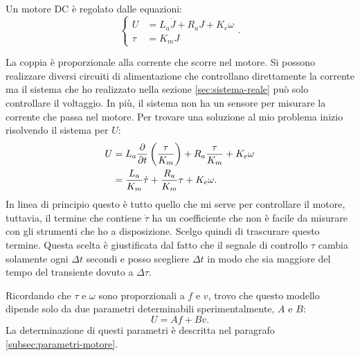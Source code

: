 Un motore DC è regolato dalle equazioni: 
\begin{equation*}
    \left\{
    \begin{aligned}
        U &= L_a \dot J + R_a J + K_e \omega \\
        \tau &= K_m J
    \end{aligned}
    \right.
    .
\end{equation*}

La coppia è proporzionale alla corrente che scorre nel motore. Si possono realizzare diversi circuiti di alimentazione che controllano direttamente la corrente ma il sistema che ho realizzato nella sezione \ref{sec:sistema-reale} può solo controllare il voltaggio. In più, il sistema non ha un sensore per misurare la corrente che passa nel motore.
Per trovare una soluzione al mio problema inizio risolvendo il sistema per $U$:
\begin{equation*}
    \begin{aligned}
        U &= L_a \frac \partial {\partial t} \left(\frac \tau {K_m}\right) + R_a \frac \tau {K_m} + K_e \omega \\
        &= \frac {L_a} {K_m} \dot\tau + \frac{R_a}{K_m}  \tau + K_e \omega.
    \end{aligned}
\end{equation*}
In linea di principio questo è tutto quello che mi serve per controllare il motore, tuttavia, il termine che contiene $\dot \tau$ ha un coefficiente che non è facile da misurare con gli strumenti che ho a disposizione. Scelgo quindi di trascurare questo termine. Questa scelta è giustificata dal fatto che il segnale di controllo $\tau$ cambia solamente ogni $\Delta t$ secondi e posso scegliere $\Delta t$ in modo che sia maggiore del tempo del transiente dovuto a $\Delta \tau$.

Ricordando che $\tau$ e $\omega$ sono proporzionali a $f$ e $v$, trovo che questo modello dipende solo da due parametri determinabili sperimentalmente, $A$ e $B$:
\begin{equation}
    U = A f + B v.
    \label{eq:caratteristica-motore}
\end{equation}
La determinazione di questi parametri è descritta nel paragrafo \ref{subsec:parametri-motore}.